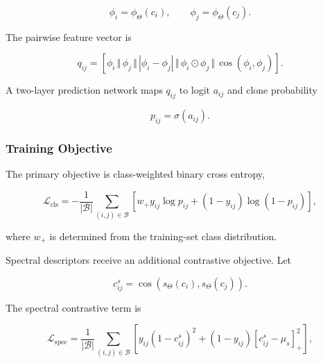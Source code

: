 \documentclass[authoryear,final,5p,times,twocolumn]{elsarticle}
\theoremstyle{plain}
\begin{document}
\begin{equation}
\phi_i
=
\phi_{\Theta}(c_i),
\qquad
\phi_j
=
\phi_{\Theta}(c_j).
\end{equation}

The pairwise feature vector is

\begin{equation}
\label{eq:pair_representation}
q_{ij}
=
\left[
    \phi_i
    \,\Vert\,
    \phi_j
    \,\Vert\,
    |\phi_i-\phi_j|
    \,\Vert\,
    \phi_i\odot\phi_j
    \,\Vert\,
    \cos(\phi_i,\phi_j)
\right].
\end{equation}

A two-layer prediction network maps $q_{ij}$ to logit $a_{ij}$ and clone
probability

\begin{equation}
\label{eq:pair_probability}
p_{ij}
=
\sigma(a_{ij}).
\end{equation}


\subsubsection{Training Objective}
\label{sec:training_objective}

The primary objective is class-weighted binary cross entropy,

\begin{equation}
\label{eq:classification_loss}
\mathcal{L}_{\mathrm{cls}}
=
-
\frac{1}{|\mathcal{B}|}
\sum_{(i,j)\in\mathcal{B}}
\left[
    w_{+}y_{ij}\log p_{ij}
    +
    (1-y_{ij})\log(1-p_{ij})
\right],
\end{equation}

where $w_{+}$ is determined from the training-set class distribution.

Spectral descriptors receive an additional contrastive objective. Let

\begin{equation}
\label{eq:spectral_cosine}
c_{ij}^{s}
=
\cos
\left(
    s_{\Theta}(c_i),
    s_{\Theta}(c_j)
\right).
\end{equation}

The spectral contrastive term is

\begin{equation}
\label{eq:spectral_loss}
\mathcal{L}_{\mathrm{spec}}
=
\frac{1}{|\mathcal{B}|}
\sum_{(i,j)\in\mathcal{B}}
\left[
    y_{ij}(1-c_{ij}^{s})^2
    +
    (1-y_{ij})
    \left[
        c_{ij}^{s}-\mu_s
    \right]_{+}^{2}
\right],
\end{equation}
\end{document}
